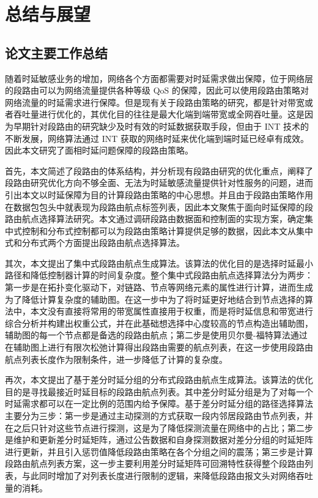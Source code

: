 \chapter{总结与展望}

\section{论文主要工作总结}

随着时延敏感业务的增加，网络各个方面都需要对时延需求做出保障，位于网络层的段路由可以为网络流量提供各种等级 \gls*{QoS} 的保障，因此可以使用段路由策略对网络流量的时延需求进行保障。但是现有关于段路由策略的研究，都是针对带宽或者吞吐量进行优化的，其优化目的往往是最大化端到端带宽或全网吞吐量。这是因为早期针对段路由的研究缺少及时有效的时延数据获取手段，但由于 \gls*{INT} 技术的不断发展，网络算法通过 \gls*{INT} 获取的网络时延来优化端到端时延已经卓有成效。因此本文研究了面相时延问题保障的段路由策略。

首先，本文简述了段路由的体系结构，并分析现有段路由研究的优化重点，阐释了段路由研究优化方向不够全面、无法为时延敏感流量提供针对性服务的问题，进而引出本文以时延保障为目的计算段路由策略的中心思想。并且由于段路由策略作用在数据包包头中就表现为段路由航点标签列表，因此本文聚焦于面向时延保障的段路由航点选择算法研究。本文通过调研段路由数据面和控制面的实现方案，确定集中式控制和分布式控制都可以为段路由策略计算提供足够的数据，因此本文从集中式和分布式两个方面提出段路由航点选择算法。


其次，本文提出了集中式段路由航点生成算法。该算法的优化目的是选择时延最小路径和降低控制器计算的时间复杂度。整个集中式段路由航点选择算法分为两步：第一步是在拓扑变化驱动下，对链路、节点等网络元素的属性进行计算，进而生成为了降低计算复杂度的辅助图。在这一步中为了将时延更好地结合到节点选择的算法中，本文没有直接将常用的带宽属性直接用于权重，而是将时延信息和带宽进行综合分析并构建出权重公式，并在此基础想选择中心度较高的节点构造出辅助图，辅助图的每一个节点都是备选的段路由航点；第二步是使用贝尔曼-福特算法通过在辅助图上进行有限次松弛计算得出段路由需要的航点列表，在这一步使用段路由航点列表长度作为限制条件，进一步降低了计算的复杂度。

再次，本文提出了基于差分时延分组的分布式段路由航点生成算法。该算法的优化目的是寻找最接近时延目标的段路由航点列表。其中差分时延分组是为了对每一个时延需求都可以在一定比例的范围内给予保障。基于差分时延分组的路径选择算法主要分为三步：第一步是通过主动探测的方式获取一段内邻居段路由节点列表，并在之后只针对这些节点进行探测，这是为了降低探测流量在网络中的占比；第二步是维护和更新差分时延矩阵，通过公告数据和自身探测数据对差分分组的时延矩阵进行更新，并且引入惩罚值降低段路由策略在各个分组之间的震荡；第三步是计算段路由航点列表方案，这一步主要利用差分时延矩阵可回溯特性获得整个段路由列表，与此同时增加了对列表长度进行限制的逻辑，来降低段路由报文头对网络吞吐量的消耗。

